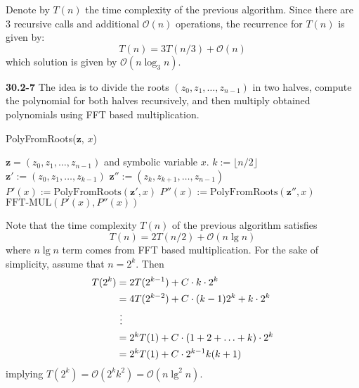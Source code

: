 \documentclass[12pt]{amsart}
\numberwithin{equation}{section}
\renewcommand{\(}{\left(}
\renewcommand{\)}{\right)}
\renewcommand{\[}{\left[}
\renewcommand{\]}{\right]}
\begin{document}
Denote by $T(n)$ the time complexity of the previous algorithm. Since there are 3 recursive calls and additional $\mathcal{O}(n)$ operations, the recurrence for $T(n)$ is given by:
$$
T(n) = 3T(n/3) + \mathcal{O}(n)
$$
which solution is given by $\mathcal{O}(n \log_3 n)$.


\bigskip

\noindent \textbf{30.2-7} The idea is to divide the roots $(z_0,z_1,\ldots,z_{n-1})$ in two halves, compute the polynomial for both halves recursively, and then multiply obtained polynomials using FFT based multiplication.

\begin{algorithm}[H]
\caption{PolyFromRoots($\mathbf{z}$, $x$)}
\begin{algorithmic}[1]
\REQUIRE $\mathbf{z} = (z_0,z_1,\ldots,z_{n-1})$ and symbolic variable $x$.
\STATE $k := \lfloor n/2 \rfloor$
\STATE $\mathbf{z'} := (z_0,z_1,\ldots,z_{k-1})$
\STATE $\mathbf{z''} := (z_k,z_{k+1},\ldots,z_{n-1})$
\STATE $P'(x) := \mathrm{PolyFromRoots}(\mathbf{z}', x)$
\STATE $P''(x) := \mathrm{PolyFromRoots}(\mathbf{z}'', x)$
 $\textrm{FFT-MUL}(P'(x), P''(x))$
\end{algorithmic}
\end{algorithm}

Note that the time complexity $T(n)$ of the previous algorithm satisfies
$$
T(n) = 2T(n/2) + \mathcal{O}(n \lg n)
$$
where $n \lg n $ term comes from FFT based multiplication. For the sake of simplicity, assume that $n=2^k$. Then
$$
\aligned
T(2^k) &= 2T(2^{k-1}) + C \cdot k \cdot 2^k \\
&= 4T(2^{k-2}) + C \cdot (k-1)2^k + k \cdot 2^k\\
& \ \vdots \\
&= 2^kT(1) + C \cdot (1+2+\ldots+k)\cdot2^k \\
&= 2^kT(1) + C \cdot 2^{k-1}k(k+1) \\
\endaligned
$$
implying $T(2^k) = \mathcal{O}(2^k k^2) = \mathcal{O}(n \lg^2 n)$.
\end{document}
